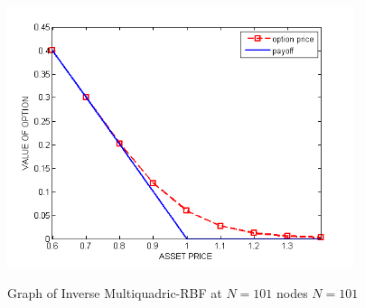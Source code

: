 \documentclass[12pt]{article}
\numberwithin{equation}{subsection} %
\begin{document}
\begin{figure}[h]
 \begin{center}
\includegraphics*[height=3in]{Imq101.png}\
\end{center}
\vspace{-0.5in}
 \caption{Graph of Inverse Multiquadric-RBF at $N=101$ nodes $N=101$}
\end{figure}
\end{document}
